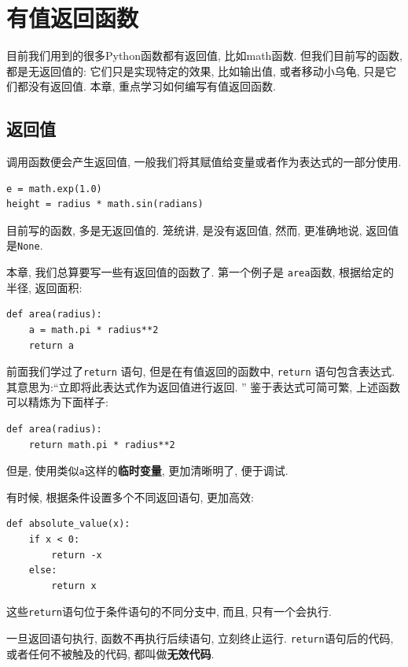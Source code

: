\documentclass[10pt]{book}
\begin{document}
\chapter{有值返回函数}
\label{fruitchap}

目前我们用到的很多Python函数都有返回值, 比如math函数. 
但我们目前写的函数, 都是无返回值的: 它们只是实现特定的效果, 比如输出值, 
或者移动小乌龟, 只是它们都没有返回值. 
本章, 重点学习如何编写有值返回函数. 

\section{返回值}

调用函数便会产生返回值, 一般我们将其赋值给变量或者作为表达式的一部分使用. 

\begin{verbatim}
e = math.exp(1.0)
height = radius * math.sin(radians)
\end{verbatim}
%
目前写的函数, 多是无返回值的. 笼统讲, 是没有返回值, 然而, 
更准确地说, 返回值是{\tt None}.

本章, 我们总算要写一些有返回值的函数了. 
第一个例子是 {\tt area}函数, 根据给定的半径, 返回面积:

\begin{verbatim}
def area(radius):
    a = math.pi * radius**2
    return a
\end{verbatim}
%
前面我们学过了{\tt return} 语句, 但是在有值返回的函数中, 
{\tt return} 语句包含表达式. 
其意思为:``立即将此表达式作为返回值进行返回. ''
鉴于表达式可简可繁, 上述函数可以精炼为下面样子:

\begin{verbatim}
def area(radius):
    return math.pi * radius**2
\end{verbatim}
%
但是, 使用类似{\tt a}这样的{\bf 临时变量}, 更加清晰明了, 便于调试. 

有时候, 根据条件设置多个不同返回语句, 更加高效:

\begin{verbatim}
def absolute_value(x):
    if x < 0:
        return -x
    else:
        return x
\end{verbatim}
%
这些{\tt return}语句位于条件语句的不同分支中, 而且, 只有一个会执行. 

一旦返回语句执行, 函数不再执行后续语句, 立刻终止运行. 
{\tt return}语句后的代码, 或者任何不被触及的代码, 都叫做{\bf 无效代码}.
\end{document}
